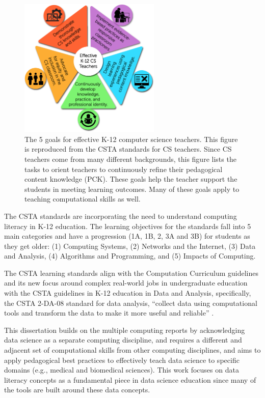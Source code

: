 \documentclass[010-intro.tex]{subfiles}
\begin{document}
    \begin{figure}[htb]
        \centering
        \includegraphics[width=0.6\textwidth]{figs/050-intro/CSTA-Standards-for-CS-Teachers---Main-Graphic.png}
        \caption[CSTA Standards for CS Teachers]{
            The 5 goals for effective K-12 computer science teachers.
            This figure is reproduced from the CSTA standards for CS teachers.
            Since CS teachers come from many different backgrounds,
            this figure lists the tasks to orient teachers to continuously refine their pedagogical content knowledge (PCK).
            These goals help the teacher support the students in meeting learning outcomes.
            Many of these goals apply to teaching computational skills as well.
        }
        \label{fig:csta-teaching-standards}
    \end{figure}

    The CSTA standards are incorporating the need to understand computing literacy in K-12 education.
    The learning objectives for the standards fall into 5 main categories and have a progression (1A, 1B, 2, 3A and 3B)
    for students as they get older:
    (1) Computing Systems,
    (2) Networks and the Internet,
    (3) Data and Analysis,
    (4) Algorithms and Programming, and
    (5) Impacts of Computing.

    The CSTA learning standards align with the Computation Curriculum guidelines
    and its new focus around complex real-world jobs in undergraduate education with
    the CSTA guidelines in K-12 education in Data and Analysis,
    specifically,
    the CSTA 2-DA-08 standard for data analysis,
    ``collect data using computational tools and transform the data to make it more useful and reliable''
    \cite{csta, csta2017, cc2020}.

    This dissertation builds on the multiple computing reports by acknowledging data science as a separate computing discipline,
    and requires a different and adjacent set of computational skills
    from other computing disciplines,
    and aims to apply pedagogical best practices to effectively teach data science to specific domains (e.g., medical and biomedical sciences).
    This work focuses on data literacy concepts as a fundamental piece in data science
    education since many of the tools are built around these data concepts.
\end{document}
